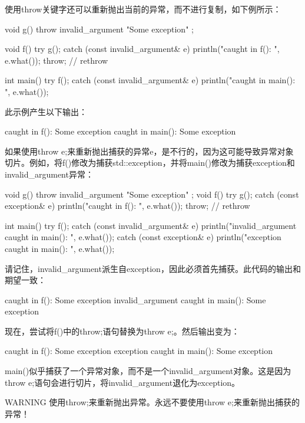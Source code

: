 使用throw关键字还可以重新抛出当前的异常，而不进行复制，如下例所示：

\begin{cpp}
void g() { throw invalid_argument { "Some exception" }; }

void f()
{
    try {
        g();
    } catch (const invalid_argument& e) {
        println("caught in f(): {}", e.what());
        throw; // rethrow
    }
}

int main()
{
    try {
        f();
    } catch (const invalid_argument& e) {
        println("caught in main(): {}", e.what());
    }
}
\end{cpp}

此示例产生以下输出：

\begin{shell}
caught in f(): Some exception
caught in main(): Some exception
\end{shell}

如果使用throw e;来重新抛出捕获的异常e，是不行的，因为这可能导致异常对象切片。例如，将f()修改为捕获std::exception，并将main()修改为捕获exception和invalid\_argument异常：

\begin{cpp}
void g() { throw invalid_argument { "Some exception" }; }
void f()
{
    try {
        g();
        } catch (const exception& e) {
        println("caught in f(): {}", e.what());
        throw; // rethrow
        }
    }

int main()
{
    try {
        f();
    } catch (const invalid_argument& e) {
        println("invalid_argument caught in main(): {}", e.what());
    } catch (const exception& e) {
        println("exception caught in main(): {}", e.what());
    }
}
\end{cpp}

请记住，invalid\_argument派生自exception，因此必须首先捕获。此代码的输出和期望一致：

\begin{shell}
caught in f(): Some exception
invalid_argument caught in main(): Some exception
\end{shell}

现在，尝试将f()中的throw;语句替换为throw e;。然后输出变为：

\begin{shell}
caught in f(): Some exception
exception caught in main(): Some exception
\end{shell}

main()似乎捕获了一个异常对象，而不是一个invalid\_argument对象。这是因为throw e;语句会进行切片，将invalid\_argument退化为exception。

\begin{myWarning}{WARNING}
使用throw;来重新抛出异常。永远不要使用throw e;来重新抛出捕获的异常！
\end{myWarning}














